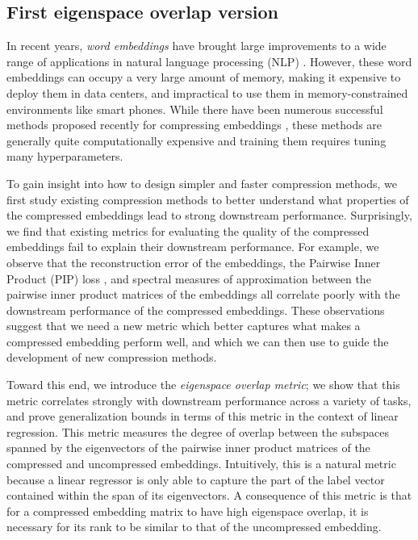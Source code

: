 \subsection{First eigenspace overlap version}
In recent years, \textit{word embeddings} \citep{word2vec13,glove14,fasttext18} have brought large improvements to a wide range of applications in natural language processing (NLP) \citep{collins16,drqa17}.
However, these word embeddings can occupy a very large amount of memory, making it expensive to deploy them in data centers, and impractical to use them in memory-constrained environments like smart phones.
While there have been numerous successful methods proposed recently for compressing embeddings \citep{sparse16,andrews16,dccl17,kway18}, these methods are generally quite computationally expensive and training them requires tuning many hyperparameters. %

To gain insight into how to design simpler and faster compression methods, we first study existing compression methods to better understand what properties of the compressed embeddings lead to strong downstream performance.
Surprisingly, we find that existing metrics for evaluating the quality of the compressed embeddings fail to explain their downstream performance.
For example, we observe that the reconstruction error of the embeddings, the Pairwise Inner Product (PIP) loss \citep{yin18}, and spectral measures of approximation between the pairwise inner product matrices of the embeddings \citep{avron17,lprff18} all correlate poorly with the downstream performance of the compressed embeddings.
These observations suggest that we need a new metric which better captures what makes a compressed embedding perform well, and which we can then use to guide the development of new compression methods.

Toward this end, we introduce the \textit{eigenspace overlap metric};
we show that this metric correlates strongly with downstream performance across a variety of tasks, and prove generalization bounds in terms of this metric in the context of linear regression.
This metric measures the degree of overlap between the subspaces spanned by the eigenvectors of the pairwise inner product matrices of the compressed and uncompressed embeddings.
Intuitively, this is a natural metric because a linear regressor is only able to capture the part of the label vector contained within the span of its eigenvectors.
A consequence of this metric is that for a compressed embedding matrix to have high eigenspace overlap, it is necessary for its rank to be similar to that of the uncompressed embedding.

